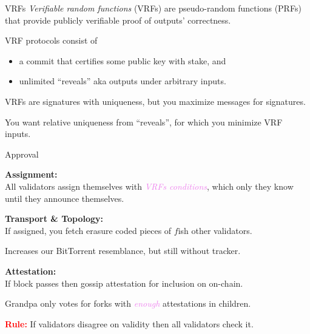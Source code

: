\documentclass{beamer}
\begin{document}
\begin{frame}[t]{VRFs}
{\em Verifiable random functions} (VRFs) are pseudo-random functions (PRFs) that provide publicly verifiable proof of outputs' correctness.

\bigskip

VRF protocols consist of
\begin{itemize}
\item a commit that certifies some public key with stake, and
\item unlimited ``reveals'' aka outputs under arbitrary inputs.
\end{itemize}

\bigskip

VRFs are signatures with uniqueness, but you maximize messages for signatures. 

\medskip

You want relative uniqueness from ``reveals'', for which you minimize VRF inputs.

\end{frame}


\begin{frame}[t]{Approval}

{\bf Assignment:}  \\ \smallskip
All validators assign themselves with \textcolor{violet}{\em VRFs conditions}, which
only they know until they announce themselves.

\bigskip

{\bf Transport \& Topology:} \\ \smallskip
If assigned, you fetch erasure coded pieces of $f$ish other validators. \\ \smallskip

\hspace*{5pt} Increases our BitTorrent resemblance, but still without tracker.

\bigskip

{\bf Attestation:}  \\ \smallskip
If block passes then gossip attestation for inclusion on on-chain.

Grandpa only votes for forks with \textcolor{violet}{\em enough} attestations in children.

\bigskip\bigskip

\textcolor{red}{\bf Rule:}  If validators disagree on validity then all validators check it.

\end{frame}
\end{document}
